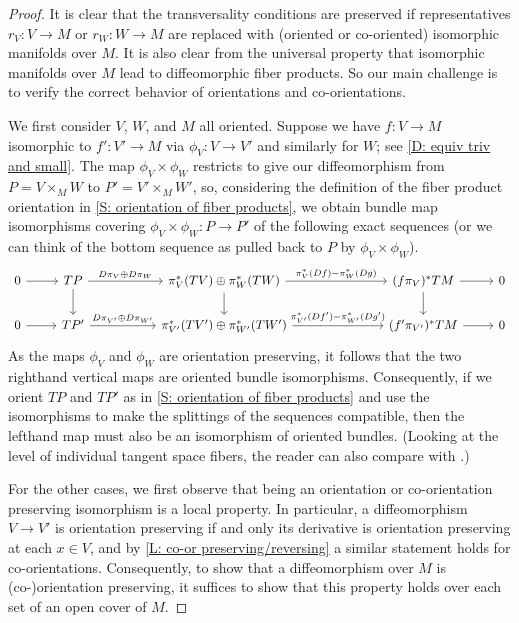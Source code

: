 \begin{proof}
	It is clear that the transversality conditions are preserved if representatives $r_V \colon V \to M$ or $r_W \colon W \to M$ are replaced with (oriented or co-oriented) isomorphic manifolds over $M$.
	It is also clear from the universal property that isomorphic manifolds over $M$ lead to diffeomorphic fiber products.
	So our main challenge is to verify the correct behavior of orientations and co-orientations.

	We first consider $V$, $W$, and $M$ all oriented.
	Suppose we have $f \colon V \to M$ isomorphic to $f' \colon V' \to M$ via $\phi_V \colon V \to V'$ and similarly for $W$; see \cref{D: equiv triv and small}.
	The map $\phi_V \times \phi_W$ restricts to give our diffeomorphism from $P = V \times_M W$ to $P' = V' \times_M W'$, so, considering the definition of the fiber product orientation in \cref{S: orientation of fiber products}, we obtain bundle map isomorphisms covering $\phi_V \times \phi_W \colon P \to P'$ of the following exact sequences (or we can think of the bottom sequence as pulled back to $P$ by $\phi_V \times \phi_W$).
	\begin{equation}
	\begin{tikzcd}\label{E: fiber orientation}
		0 \arrow[r] & TP \arrow[r,"D\pi_V \oplus D\pi_W"] \arrow[d] &[1cm] \pi_V^*(TV) \oplus \pi_W^*(TW) \arrow[r,"\pi_V^*(Df)-\pi_W^*(Dg)"] \arrow[d] &[1.7cm] (f\pi_V)^*TM \arrow[r] \arrow[d] & 0 \\
		0 \arrow[r] & TP' \arrow[r,"D\pi_{V'} \oplus D\pi_{W'}"] & \pi_{V'}^*(TV') \oplus \pi_{W'}^*(TW') \arrow[r,"\pi_{V'}^*(Df')-\pi_{W'}^*(Dg')"] & (f'\pi_{V'})^*TM \arrow[r] & 0
	\end{tikzcd}
	\end{equation}
	As the maps $\phi_V$ and $\phi_W$ are orientation preserving, it follows that the two righthand vertical maps are oriented bundle isomorphisms.
	Consequently, if we orient $TP$ and $TP'$ as in \cref{S: orientation of fiber products} and use the isomorphisms to make the splittings of the sequences compatible, then the lefthand map must also be an isomorphism of oriented bundles.
	(Looking at the level of individual tangent space fibers, the reader can also compare with \cite[Sections 9.1.1 and 9.3.1]{RamBas09}.)

	For the other cases, we first observe that being an orientation or co-orientation preserving isomorphism is a local property.
	In particular, a diffeomorphism $V \to V'$ is orientation preserving if and only its derivative is orientation preserving at each $x \in V$, and by \cref{L: co-or preserving/reversing} a similar statement holds for co-orientations.
	Consequently, to show that a diffeomorphism over $M$ is (co-)orientation preserving, it suffices to show that this property holds over each set of an open cover of $M$.


\end{proof}

